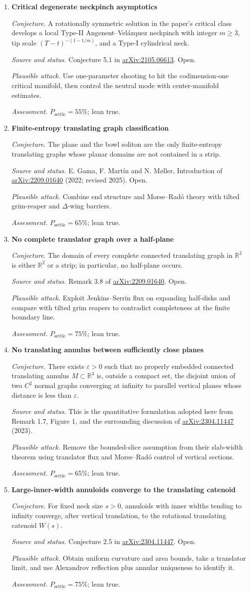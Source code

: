 \documentclass[11pt]{article}
\newcommand{\cand}[5]{%
  \item \textbf{#1}\par
  \emph{Conjecture.} #2\par
  \emph{Source and status.} #3\par
  \emph{Plausible attack.} #4\par
  \emph{Assessment.} #5
}
\newcommand{\psettle}{P_{\mathrm{settle}}}
\begin{document}
\begin{enumerate}[label=\textbf{L\arabic*.}]
\cand{Critical degenerate neckpinch asymptotics}
{A rotationally symmetric solution in the paper's critical class develops a local Type-II Angenent--Vel\'azquez neckpinch with integer $m\ge3$, tip scale $(T-t)^{-(1-1/m)}$, and a Type-I cylindrical neck.}
{Conjecture 5.1 in \href{https://arxiv.org/abs/2105.06613}{arXiv:2105.06613}.  Open.}
{Use one-parameter shooting to hit the codimension-one critical manifold, then control the neutral mode with center-manifold estimates.}
{$\psettle=55\%$; lean true.}

\cand{Finite-entropy translating graph classification}
{The plane and the bowl soliton are the only finite-entropy translating graphs whose planar domains are not contained in a strip.}
{E. Gama, F. Mart\'in and N. M\o ller, Introduction of \href{https://arxiv.org/abs/2209.01640}{arXiv:2209.01640} (2022; revised 2025).  Open.}
{Combine end structure and Morse--Rad\'o theory with tilted grim-reaper and $\Delta$-wing barriers.}
{$\psettle=65\%$; lean true.}

\cand{No complete translator graph over a half-plane}
{The domain of every complete connected translating graph in $\mathbb R^3$ is either $\mathbb R^2$ or a strip; in particular, no half-plane occurs.}
{Remark 3.8 of \href{https://arxiv.org/abs/2209.01640}{arXiv:2209.01640}.  Open.}
{Exploit Jenkins--Serrin flux on expanding half-disks and compare with tilted grim reapers to contradict completeness at the finite boundary line.}
{$\psettle=75\%$; lean true.}

\cand{No translating annulus between sufficiently close planes}
{There exists $\varepsilon>0$ such that no properly embedded connected translating annulus $M\subset\mathbb R^3$ is, outside a compact set, the disjoint union of two $C^2$ normal graphs converging at infinity to parallel vertical planes whose distance is less than $\varepsilon$.}
{This is the quantitative formulation adopted here from Remark 1.7, Figure 1, and the surrounding discussion of \href{https://arxiv.org/abs/2304.11447}{arXiv:2304.11447} (2023).}
{Remove the bounded-slice assumption from their slab-width theorem using translator flux and Morse--Rad\'o control of vertical sections.}
{$\psettle=65\%$; lean true.}

\cand{Large-inner-width annuloids converge to the translating catenoid}
{For fixed neck size $s>0$, annuloids with inner widths tending to infinity converge, after vertical translation, to the rotational translating catenoid $W(s)$.}
{Conjecture 2.5 in \href{https://arxiv.org/abs/2304.11447}{arXiv:2304.11447}.  Open.}
{Obtain uniform curvature and area bounds, take a translator limit, and use Alexandrov reflection plus annular uniqueness to identify it.}
{$\psettle=75\%$; lean true.}


\end{enumerate}
\end{document}
